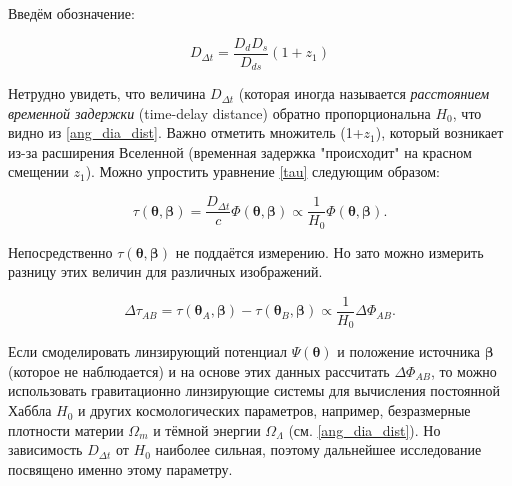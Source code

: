 Введём обозначение:
 
\begin{equation}\label{dDt}
D_{\Delta t} = \frac{D_{d} D_{s}}{D_{d s}} (1+z_1) 
\end{equation}

Нетрудно увидеть, что величина $D_{\Delta t}$ (которая иногда называется \textit{расстоянием временной задержки} (time-delay distance) обратно пропорциональна $H_0$, что видно из \eqref{ang_dia_dist}. Важно отметить множитель (1+$z_1$), который возникает из-за расширения Вселенной (временная задержка "происходит" на красном смещении $z_1$). Можно упростить уравнение \eqref{tau} следующим образом:

\begin{equation}\label{ef}
\tau(\boldsymbol{\theta}, \boldsymbol{\beta})=\frac{D_{\Delta t}}{c} \Phi(\boldsymbol{\theta},\boldsymbol{\beta}) \propto \frac{1}{H_0}\Phi(\boldsymbol{\theta},\boldsymbol{\beta}).
\end{equation}

Непосредственно $\tau(\boldsymbol{\theta}, \boldsymbol{\beta})$ не поддаётся измерению. Но зато можно измерить разницу этих величин для различных изображений.

\begin{equation}\label{dt}
\Delta \tau_{AB} = \tau(\boldsymbol{\theta}_A, \boldsymbol{\beta}) - \tau(\boldsymbol{\theta}_B, \boldsymbol{\beta}) \propto \frac{1}{H_0}\Delta \Phi_{AB}.
\end{equation}



Если смоделировать линзирующий потенциал $\Psi(\boldsymbol{\theta})$ и положение источника $\boldsymbol{\beta}$ (которое не наблюдается) и на основе этих данных рассчитать $\Delta \Phi_{AB}$, то можно использовать гравитационно линзирующие системы для вычисления постоянной Хаббла $H_0$ и других космологических параметров, например, безразмерные плотности материи $\Omega_m$ и тёмной энергии $\Omega_{\Lambda}$ (см. \eqref{ang_dia_dist}). Но зависимость $D_{\Delta t}$ от $H_0$ наиболее сильная, поэтому дальнейшее исследование посвящено именно этому параметру.

